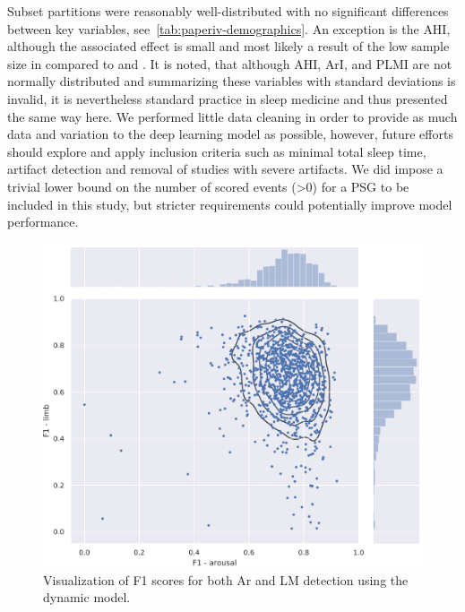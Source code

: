 Subset partitions were reasonably well-distributed with no significant differences between key variables, see~\cref{tab:paperiv-demographics}. 
An exception is the \ac{AHI}, although the associated effect is small and most likely a result of the low sample size in \eval compared to \train and \test. 
It is noted, that although \ac{AHI}, \ac{ArI}, and \ac{PLMI} are not normally distributed and summarizing these variables with standard deviations is invalid, it is nevertheless standard practice in sleep medicine and thus presented the same way here. 
We performed little data cleaning in order to provide as much data and variation to the deep learning model as possible, however, future efforts should explore and apply inclusion criteria such as minimal total sleep time, artifact detection and removal of studies with severe artifacts. 
We did impose a trivial lower bound on the number of scored events (\num{>0}) for a \ac{PSG} to be included in this study, but stricter requirements could potentially improve model performance.
\begin{figure}[t]
    \centering
    \includegraphics[width=\textwidth]{figures/paper-iv/embc19-distribution.pdf}
    \caption[Visualization of F1 scores]{Visualization of F1 scores for both \ac{Ar} and \ac{LM} detection using the dynamic model.}
    \label{fig:paperiv-test_distribution}
\end{figure}

